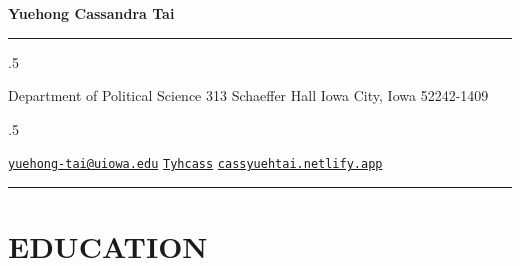\documentclass[10.5pt,]{article}
\begin{document}
	
	
	\centerline{\huge \bf Yuehong Cassandra Tai}
	
	
	
	\vspace{2 mm}
	
	\hrule
	
	\vspace{2 mm}
	
	
	\moveleft.5\hoffset\centerline{Department of Political Science 313
Schaeffer Hall Iowa City, Iowa 52242-1409}
	\moveleft.5\hoffset\centerline{ {\FA\faEnvelope} \hspace{1 mm} \href{mailto:}{\tt \href{mailto:yuehong-tai@uiowa.edu}{\nolinkurl{yuehong-tai@uiowa.edu}}} \hspace{1 mm}  {\FA\faGithub} \hspace{1 mm} \href{http://github.com/Tyhcass}{\tt Tyhcass} \hspace{1 mm}    {\FA\faGlobe} \hspace{1 mm} \href{http://cassyuehtai.netlify.app}{\tt cassyuehtai.netlify.app}   }
	
	\vspace{2 mm}
	
	\hrule
	
		
	\hypertarget{section}{%
 \section{}\label{section}}

 \hypertarget{education}{%
 \section{EDUCATION}\label{education}}
\end{document}
